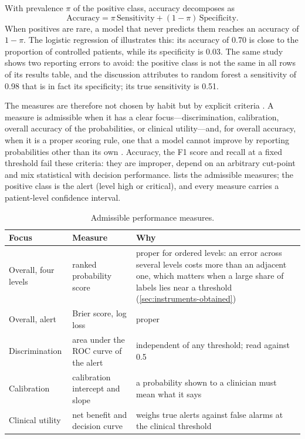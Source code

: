 With prevalence $\pi$ of the positive class, accuracy decomposes as
\begin{equation}
  \text{Accuracy} = \pi\,\text{Sensitivity} + (1-\pi)\,\text{Specificity}.
\end{equation}
When positives are rare, a model that never predicts them reaches an accuracy of $1-\pi$. The logistic regression of \textcite{mendoza2025} illustrates this: its accuracy of 0.70 is close to the proportion of controlled patients, while its specificity is 0.03. The same study shows two reporting errors to avoid: the positive class is not the same in all rows of its results table, and the discussion attributes to random forest a sensitivity of 0.98 that is in fact its specificity; its true sensitivity is 0.51.

The measures are therefore not chosen by habit but by explicit criteria \parencite{vancalster2025}. A measure is admissible when it has a clear focus---discrimination, calibration, overall accuracy of the probabilities, or clinical utility---and, for overall accuracy, when it is a proper scoring rule, one that a model cannot improve by reporting probabilities other than its own \parencite{gneiting2007}. Accuracy, the F1 score and recall at a fixed threshold fail these criteria: they are improper, depend on an arbitrary cut-point and mix statistical with decision performance.  lists the admissible measures; the positive class is the alert (level high or critical), and every measure carries a patient-level confidence interval.

\begin{table}[htbp]
\centering\footnotesize
\caption{Admissible performance measures.}\label{tab:metrics}
\begin{tabularx}{\textwidth}{@{}>{\raggedright\arraybackslash}p{2.6cm} >{\raggedright\arraybackslash}p{4.0cm} X@{}}
\toprule
\textbf{Focus} & \textbf{Measure} & \textbf{Why} \\
\midrule
Overall, four levels & ranked probability score \parencite{epstein1969} & proper for ordered levels: an error across several levels costs more than an adjacent one, which matters when a large share of labels lies near a threshold (\cref{sec:instruments-obtained}) \\
Overall, alert & Brier score, log loss & proper \\
Discrimination & area under the ROC curve of the alert & independent of any threshold; read against 0.5 \\
Calibration & calibration intercept and slope \parencite{vancalster2019} & a probability shown to a clinician must mean what it says \\
Clinical utility & net benefit and decision curve \parencite{vickers2006} & weighs true alerts against false alarms at the clinical threshold \\
\bottomrule
\end{tabularx}
\end{table}


